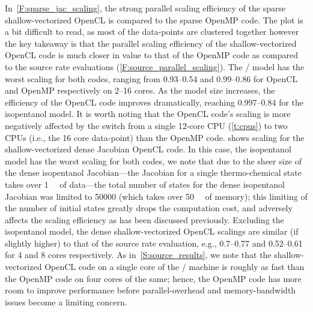 \documentclass[12pt,number,sort&compress,preprint]{elsarticle}
\begin{document}
In~\cref{F:sparse_jac_scaling}, the strong parallel scaling efficiency of the sparse shallow-vectorized OpenCL is compared to the sparse OpenMP code.
The plot is a bit difficult to read, as most of the data-points are clustered together however the key takeaway is that the parallel scaling efficiency of the shallow-vectorized OpenCL code is much closer in value to that of the OpenMP code as compared to the source rate evaluations (\cref{F:source_parallel_scaling}).
The \slash{} model has the worst scaling for both codes, ranging from \numrange{0.93}{0.54} and \numrange{0.99}{0.86} for OpenCL and OpenMP respectively on \numrange{2}{16} cores.
As the model size increases, the efficiency of the OpenCL code improves dramatically, reaching \numrange{0.997}{0.84} for the isopentanol model.
It is worth noting that the OpenCL code's scaling is more negatively affected by the switch from a single 12-core CPU (\cref{t:cpus}) to two CPUs (i.e., the 16 core data-point) than the OpenMP code.
 shows scaling for the shallow-vectorized dense Jacobian OpenCL code.
In this case, the isopentanol model has the worst scaling for both codes, we note that due to the sheer size of the dense isopentanol Jacobian---the Jacobian for a single thermo-chemical state takes over \SI{1}{\mega\byte} of data---the total number of states for the dense isopentanol Jacobian was limited to \num{50000} (which takes over \SI{50}{\giga\byte} of memory); this limiting of the number of initial states greatly drops the computation cost, and adversely affects the scaling efficiency as has been discussed previously.
Excluding the isopentanol model, the dense shallow-vectorized OpenCL scalings are similar (if slightly higher) to that of the source rate evaluation, e.g., \numrange{0.7}{0.77} and \numrange{0.52}{0.61} for \num{4} and \num{8} cores respectively.
As in~\cref{S:source_results}, we note that the shallow-vectorized OpenCL code on a single core of the \avx/ machine is roughly as fast than the OpenMP code on four cores of the same; hence, the OpenMP code has more room to improve performance before parallel-overhead and memory-bandwidth issues become a limiting concern.
\end{document}
